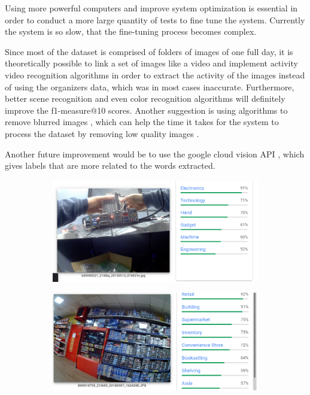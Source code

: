 Using more powerful computers and improve system optimization is essential in order to conduct a more large quantity of tests to fine tune the system. Currently the system is so slow, that the fine-tuning process becomes complex.

Since most of the dataset is comprised of folders of images of one full day, it is theoretically possible to link a set of images like a video and implement activity video recognition algorithms in order to extract the activity of the images instead of using the organizers data, which was in most cases inaccurate. Furthermore, better scene recognition and even color recognition algorithms will definitely improve the f1-measure@10 scores. Another suggestion is using algorithms to remove blurred images , which can help the time it takes for the system to process the dataset by removing low quality images .

Another future improvement would be to use the google cloud vision API \cite{google}, which gives labels that are more related to the words extracted. 


\begin{figure}[H]
    \centering
    \captionsetup{justification=centering}
    \begin{subfigure}{0.45\textwidth}
    \includegraphics[width=\textwidth]{Sections/8Conclusion/images/google.png} 
  
    \end{subfigure}
    \begin{subfigure}{0.45\textwidth}
    \includegraphics[width=\textwidth]{Sections/8Conclusion/images/labels.png}
    \end{subfigure}

  \end{figure}



